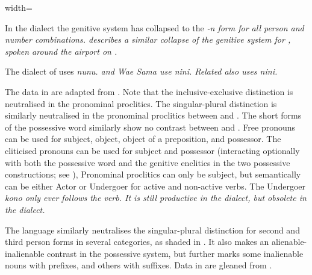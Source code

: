 \begin{table}
\begin{adjustbox}{width=\textwidth}
\begin{threeparttable}
\begin{tablenotes}
			\item[†]	{In the  dialect the genitive system has collapsed to
								the  \it{-n} form for all person and number combinations.
								\citet{Collins1980} describes a similar collapse of the genitive
								system for , spoken around the airport on .}
			\item[‡]	{The  dialect of  uses \it{nunu}.
								 and Wae Sama use \it{nini}.
								Related  also uses \it{nini}.}
		\end{tablenotes}
	\end{threeparttable}
\end{adjustbox}
\end{table}

The  data in  are adapted from \citet{Grimes1991c}.
Note that the inclusive-exclusive distinction is neutralised
in the  pronominal proclitics.
The singular-plural distinction is similarly neutralised in the
pronominal proclitics between  and .
The short forms of the possessive word similarly show no contrast
between  and .
Free pronouns can be used for subject,
object, object of a preposition, and possessor.
The cliticised pronouns can be used for subject
and possessor (interacting optionally with both the possessive
word and the genitive enclitics in the two possessive constructions;
see ), Pronominal proclitics can only be subject,
but semantically can be either Actor or Undergoer for active and non-active verbs.
The Undergoer \it{kono} only ever follows the verb.
It is still productive in the  dialect,
but obsolete in the  dialect.

The  language  similarly neutralises
the singular-plural distinction for second
and third person forms in several categories,
as shaded in .
It also makes an alienable-inalienable contrast in the possessive system,
but further marks some inalienable nouns with prefixes,
and others with suffixes.
Data in  are gleaned from \citet{WalkerWalker1991}.

